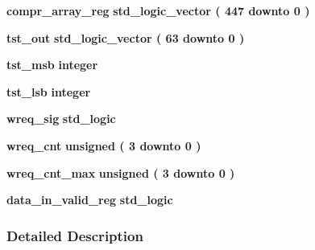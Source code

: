 \begin{DoxyCompactItemize}
\item 
{\bf compr\+\_\+array\+\_\+reg} {\bfseries \textcolor{comment}{std\+\_\+logic\+\_\+vector}\textcolor{vhdlchar}{ }\textcolor{vhdlchar}{(}\textcolor{vhdlchar}{ }\textcolor{vhdlchar}{ } \textcolor{vhdldigit}{447} \textcolor{vhdlchar}{ }\textcolor{keywordflow}{downto}\textcolor{vhdlchar}{ }\textcolor{vhdlchar}{ } \textcolor{vhdldigit}{0} \textcolor{vhdlchar}{ }\textcolor{vhdlchar}{)}\textcolor{vhdlchar}{ }} 
\item 
{\bf tst\+\_\+out} {\bfseries \textcolor{comment}{std\+\_\+logic\+\_\+vector}\textcolor{vhdlchar}{ }\textcolor{vhdlchar}{(}\textcolor{vhdlchar}{ }\textcolor{vhdlchar}{ } \textcolor{vhdldigit}{63} \textcolor{vhdlchar}{ }\textcolor{keywordflow}{downto}\textcolor{vhdlchar}{ }\textcolor{vhdlchar}{ } \textcolor{vhdldigit}{0} \textcolor{vhdlchar}{ }\textcolor{vhdlchar}{)}\textcolor{vhdlchar}{ }} 
\item 
{\bf tst\+\_\+msb} {\bfseries \textcolor{comment}{integer}\textcolor{vhdlchar}{ }} 
\item 
{\bf tst\+\_\+lsb} {\bfseries \textcolor{comment}{integer}\textcolor{vhdlchar}{ }} 
\item 
{\bf wreq\+\_\+sig} {\bfseries \textcolor{comment}{std\+\_\+logic}\textcolor{vhdlchar}{ }} 
\item 
{\bf wreq\+\_\+cnt} {\bfseries \textcolor{comment}{unsigned}\textcolor{vhdlchar}{ }\textcolor{vhdlchar}{(}\textcolor{vhdlchar}{ }\textcolor{vhdlchar}{ } \textcolor{vhdldigit}{3} \textcolor{vhdlchar}{ }\textcolor{keywordflow}{downto}\textcolor{vhdlchar}{ }\textcolor{vhdlchar}{ } \textcolor{vhdldigit}{0} \textcolor{vhdlchar}{ }\textcolor{vhdlchar}{)}\textcolor{vhdlchar}{ }} 
\item 
{\bf wreq\+\_\+cnt\+\_\+max} {\bfseries \textcolor{comment}{unsigned}\textcolor{vhdlchar}{ }\textcolor{vhdlchar}{(}\textcolor{vhdlchar}{ }\textcolor{vhdlchar}{ } \textcolor{vhdldigit}{3} \textcolor{vhdlchar}{ }\textcolor{keywordflow}{downto}\textcolor{vhdlchar}{ }\textcolor{vhdlchar}{ } \textcolor{vhdldigit}{0} \textcolor{vhdlchar}{ }\textcolor{vhdlchar}{)}\textcolor{vhdlchar}{ }} 
\item 
{\bf data\+\_\+in\+\_\+valid\+\_\+reg} {\bfseries \textcolor{comment}{std\+\_\+logic}\textcolor{vhdlchar}{ }} 
\end{DoxyCompactItemize}


\subsubsection{Detailed Description}



